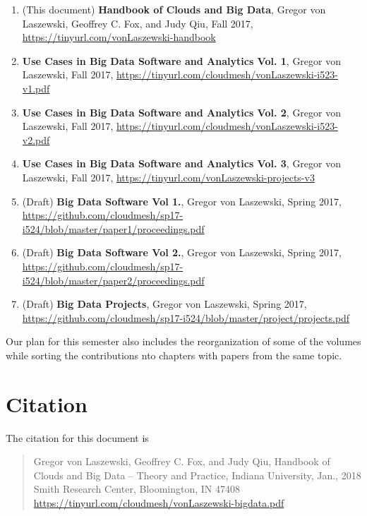 \begin{enumerate}
\item (This document) {\bf Handbook of Clouds and Big Data}, Gregor von Laszewski,
  Geoffrey C. Fox, and Judy Qiu, Fall 2017,
  \url{https://tinyurl.com/vonLaszewski-handbook}

\item {\bf Use Cases in Big Data Software and
  Analytics Vol. 1}, Gregor von Laszewski, Fall 2017,
  \url{https://tinyurl.com/cloudmesh/vonLaszewski-i523-v1.pdf}

\item {\bf Use Cases in Big Data Software and
  Analytics Vol. 2}, Gregor von Laszewski, Fall 2017, 
  \url{https://tinyurl.com/cloudmesh/vonLaszewski-i523-v2.pdf}

\item  {\bf Use Cases in Big Data Software and
  Analytics Vol. 3}, Gregor von Laszewski, Fall 2017, 
  \url{https://tinyurl.com/vonLaszewski-projects-v3}

\item (Draft) {\bf Big Data Software Vol 1.}, Gregor von Laszewski, Spring 2017,
\url{https://github.com/cloudmesh/sp17-i524/blob/master/paper1/proceedings.pdf}

\item (Draft) {\bf Big Data Software Vol 2.}, Gregor von Laszewski, Spring 2017,
\url{https://github.com/cloudmesh/sp17-i524/blob/master/paper2/proceedings.pdf}

\item (Draft) {\bf Big Data Projects}, Gregor von Laszewski, Spring 2017,
\url{https://github.com/cloudmesh/sp17-i524/blob/master/project/projects.pdf}

\end{enumerate}

Our plan for this semester also includes the reorganization of some of
the volumes while sorting the contributions nto chapters with papers
from the same topic.

\section{Citation}

The citation for this document is 

\begin{quote}
Gregor von Laszewski, Geoffrey C. Fox, and Judy Qiu, Handbook of
Clouds and Big Data -- Theory and Practice, Indiana University,
Jan., 2018
Smith Research Center, Bloomington, IN 47408
\url{https://tinyurl.com/cloudmesh/vonLaszewski-bigdata.pdf} 
\end{quote}

